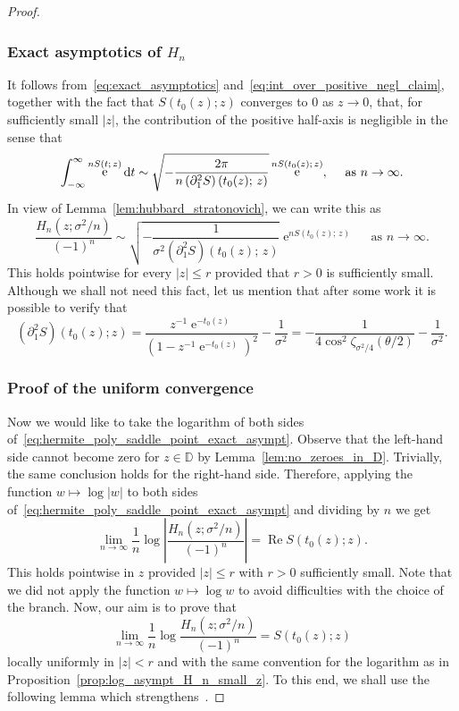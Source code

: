 \documentclass[AHL,Unicode,longabstracts,published]{cedram}
\DeclareMathOperator{\Ree}{Re}
\DeclareMathOperator{\eee}{e}
\newcommand{\bD}{\mathbb{D}}
\newcommand*\dint{\text{\normalfont d}}
\begin{document}
\begin{proof}
\subsubsection*{Exact asymptotics of $H_n$}

It follows from~\eqref{eq:exact_asymptotics} and~\eqref{eq:int_over_positive_negl_claim}, together with the fact that $S(t_0(z);z)$ converges to $0$ as $z\to 0$, that, for sufficiently small $|z|$, the contribution of the positive half-axis is negligible in the sense that
\[
\int_{-\infty}^\infty \eee^{n S(t;\,z)} \dint t
\sim
\sqrt{-\frac{2\pi}{n \left(\partial_1^2 S\right)(t_0(z);\,z)}} \eee^{n S(t_0(z);\,z)},
\quad
\text{ as } n\to\infty.
\]
In view of Lemma~\ref{lem:hubbard_stratonovich}, we can write this as
\begin{equation}\label{eq:hermite_poly_saddle_point_exact_asympt}
\frac{H_n(z;\sigma^2/n)}{(-1)^n} \sim \sqrt{-\frac{1}{\sigma^2 (\partial_1^2 S)(t_0(z);\,z)}} \eee^{n S(t_0(z);\,z)}
\quad
\text{ as } n\to\infty.
\end{equation}
This holds pointwise for every $|z| \leq r$ provided that $r>0$ is sufficiently small. Although we shall not need this fact, let us mention that after some work it is possible to verify that
\begin{equation}\label{eq:second_der_S}
\left(\partial_1^2 S\right)(t_0(z); z) =
\frac{z^{-1}\eee^{-t_0(z)}}{\left(1 - z^{-1}\eee^{-t_0(z)}\right)^2} - \frac 1 {\sigma^2} = -\frac{1}{4 \cos^2 \zeta_{\sigma^2/4}(\theta/2)} - \frac 1 {\sigma^2}.
\end{equation}

\subsubsection*{Proof of the uniform convergence}

Now we would like to take the logarithm of both sides of~\eqref{eq:hermite_poly_saddle_point_exact_asympt}. Observe that the left-hand side cannot become zero for $z\in \bD$ by Lemma~\ref{lem:no_zeroes_in_D}. Trivially, the same conclusion holds for the right-hand side. Therefore, applying the function $w\mapsto \log |w|$ to both sides of~\eqref{eq:hermite_poly_saddle_point_exact_asympt} and dividing by $n$ we get
\begin{equation}\label{eq:asympt_H_n_proof_Re}
\lim_{n\to\infty} \frac 1n \log \left|\frac{H_n\left(z;\sigma^2/n\right)}{(-1)^n}\right| =
\Ree S(t_0(z);z).
\end{equation}
This holds pointwise in $z$ provided $|z| \leq r$ with $r>0$ sufficiently small. Note that we did not apply the function $w\mapsto \log w$ to avoid difficulties with the choice of the branch. Now, our aim is to prove that
\begin{equation}\label{eq:asympt_H_n_proof_no_Re}
\lim_{n\to\infty} \frac 1n \log\frac{H_n\left(z;\sigma^2/n\right)}{(-1)^n} = S(t_0(z);z)
\end{equation}
locally uniformly in $|z| < r$ and with the same convention for the logarithm as in Proposition~\ref{prop:log_asympt_H_n_small_z}. To this end, we shall use the following lemma which strengthens~\cite[Lemma~3.8]{kabluchko_rep_diff_free_poi}.


\end{proof}
\end{document}
